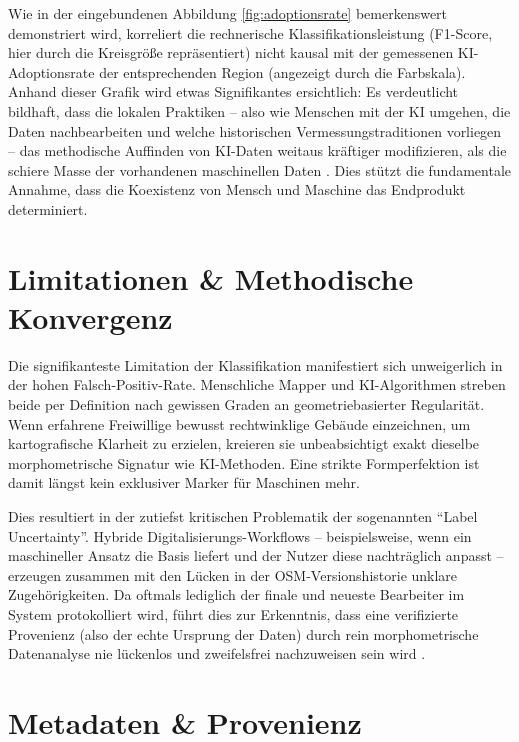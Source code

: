 \documentclass[12pt,twoside=false,a4paper,parskip]{scrbook}
\begin{document}
Wie in der eingebundenen Abbildung \ref{fig:adoptionsrate} bemerkenswert demonstriert wird, korreliert die rechnerische Klassifikationsleistung (F1-Score, hier durch die Kreisgröße repräsentiert) nicht kausal mit der gemessenen KI-Adoptionsrate der entsprechenden Region (angezeigt durch die Farbskala). Anhand dieser Grafik wird etwas Signifikantes ersichtlich: Es verdeutlicht bildhaft, dass die lokalen Praktiken – also wie Menschen mit der KI umgehen, die Daten nachbearbeiten und welche historischen Vermessungstraditionen vorliegen – das methodische Auffinden von KI-Daten weitaus kräftiger modifizieren, als die schiere Masse der vorhandenen maschinellen Daten \cite[S.~13, 16, 18]{memduhoglu2026ml}. Dies stützt die fundamentale Annahme, dass die Koexistenz von Mensch und Maschine das Endprodukt determiniert.


\chapter{Limitationen \& Methodische Konvergenz} \label{sec:limitationen}

Die signifikanteste Limitation der Klassifikation manifestiert sich unweigerlich in der hohen Falsch-Positiv-Rate. Menschliche Mapper und KI-Algorithmen streben beide per Definition nach gewissen Graden an geometriebasierter Regularität. Wenn erfahrene Freiwillige bewusst rechtwinklige Gebäude einzeichnen, um kartografische Klarheit zu erzielen, kreieren sie unbeabsichtigt exakt dieselbe morphometrische Signatur wie KI-Methoden. Eine strikte Formperfektion ist damit längst kein exklusiver Marker für Maschinen mehr.

Dies resultiert in der zutiefst kritischen Problematik der sogenannten \enquote{Label Uncertainty}. Hybride Digitalisierungs-Workflows -- beispielsweise, wenn ein maschineller Ansatz die Basis liefert und der Nutzer diese nachträglich anpasst -- erzeugen zusammen mit den Lücken in der OSM-Versionshistorie unklare Zugehörigkeiten. Da oftmals lediglich der finale und neueste Bearbeiter im System protokolliert wird, führt dies zur Erkenntnis, dass eine verifizierte Provenienz (also der echte Ursprung der Daten) durch rein morphometrische Datenanalyse nie lückenlos und zweifelsfrei nachzuweisen sein wird \cite[S.~20]{memduhoglu2026ml}.


\chapter{Metadaten \& Provenienz} \label{sec:metadaten}
\end{document}
